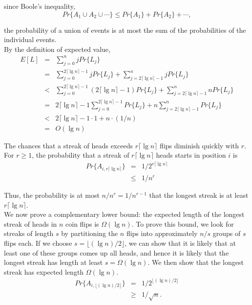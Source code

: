\documentclass[12pt]{article}
\begin{document}
since Boole's inequality,
\begin{equation*}
  Pr \{ A_1 \cup A_2 \cup \cdots \} \le Pr \{ A_1 \} + Pr \{ A_2 \} + \cdots,
\end{equation*}

the probability of a union of events is at most the sum of the probabilities of the individual events. \\

By the definition of expected value,
\begin{eqnarray*}
  E[L]
  &=& \sum_{j=0}^{n} j Pr \{ L_j \} \\
  &=& \sum_{j=0}^{2 \lceil \lg n \rceil - 1} j Pr \{ L_j \}
      + \sum_{j = 2 \lceil \lg n \rceil - 1}^{n} j Pr \{ L_j \} \\
  &<& \sum_{j=0}^{2 \lceil \lg n \rceil - 1} (2 \lceil \lg n \rceil - 1)
      Pr \{ L_j \} + \sum_{j = 2 \lceil \lg n \rceil - 1}^{n} n Pr \{ L_j \} \\
  &=& 2 \lceil \lg n \rceil - 1 \sum_{j=0}^{2 \lceil \lg n \rceil - 1} 
      Pr \{ L_j \} + n \sum_{j = 2 \lceil \lg n \rceil - 1}^{n} Pr \{ L_j \} \\
  &<& 2 \lceil \lg n \rceil - 1 \cdot 1 + n \cdot (1/n) \\
  &=& O(\lg n)
\end{eqnarray*}

The chances that a streak of heads exceeds $r \lceil \lg n \rceil$ flips diminish quickly with $r$. For $r \ge 1$, the probability that a streak of $r \lceil \lg n \rceil$ heads starts in position $i$ is
\begin{eqnarray*}
  Pr \{ A_{i, r \lceil \lg n \rceil} \}
  &=& 1 / 2^{r \lceil \lg n \rceil} \\
  &\le& 1 / n^r
\end{eqnarray*}

Thus, the probability is at most $n / n^r = 1 / n^{r-1}$ that the longest streak is at least $r \lceil \lg n \rceil$. \\

We now prove a complementary lower bound: the expected length of the longest streak of heads in $n$ coin flips is $\Omega (\lg n)$. To prove this bound, we look for streaks of length $s$ by partitioning the $n$ flips into approximately $n/s$ groups of $s$ flips each. If we choose $s = \lfloor (\lg n)/2 \rfloor$, we can show that it is likely that at least one of these groups comes up all heads, and hence it is likely that the longest streak has length at least $s = \Omega (\lg n)$. We then show that the longest streak has expected length $\Omega (\lg n)$.
\begin{eqnarray*}
  Pr \{ A_{i, \lfloor (\lg n)/2 \rfloor} \}
  &=& 1 / 2^{\lfloor (\lg n)/2 \rfloor} \\
  &\ge& 1 / \sqrt n.
\end{eqnarray*}
\end{document}
